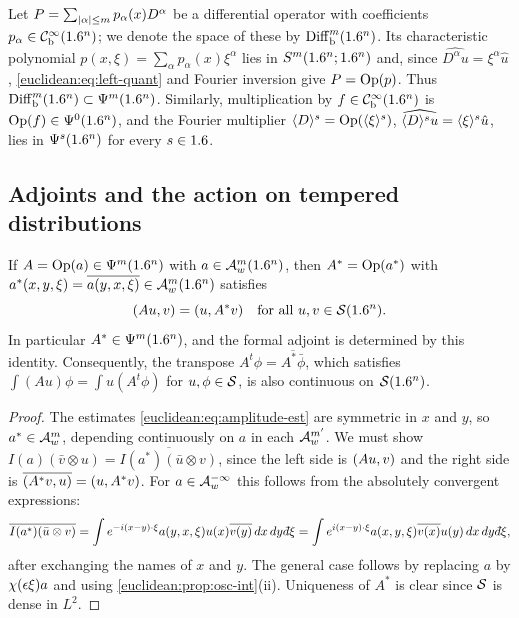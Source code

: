 \begin{example}\label{euclidean:ex:diff-ops}
  Let $P=\sum_{\lvert \alpha\rvert\le m}p_\alpha(x)D^\alpha$ be a differential operator
  with coefficients $p_\alpha\in\mathcal{C}^\infty_{\mathrm{b}}(1.6^n)$; we denote the space of these by
  $\operatorname{Diff}^{m}_{\mathrm b}(1.6^n)$. Its characteristic polynomial
  $p(x,\xi)=\sum_\alpha p_\alpha(x)\xi^\alpha$ lies in $S^m(1.6^n;1.6^n)$ and,
  since $\widehat{D^\alpha u}=\xi^\alpha\hat u$, \eqref{euclidean:eq:left-quant}
  and Fourier inversion give $P=\operatorname{Op}(p)$. Thus
  $\operatorname{Diff}^{m}_{\mathrm b}(1.6^n)\subset\Psi^{m}(1.6^n)$. Similarly, multiplication
  by $f\in\mathcal{C}^\infty_{\mathrm{b}}(1.6^n)$ is $\operatorname{Op}(f)\in\Psi^{0}(1.6^n)$, and the Fourier multiplier
  $\langle D\rangle^s=\operatorname{Op}(\langle \xi\rangle^s)$, $\widehat{\langle D\rangle^su}=\langle \xi\rangle^s\hat u$, lies in
  $\Psi^{s}(1.6^n)$ for every $s\in1.6$.
\end{example}

\subsection{Adjoints and the action on tempered distributions}

\begin{proposition}\label{euclidean:prop:adjoint}
  If $A=\operatorname{Op}(a)\in\Psi^{m}(1.6^n)$ with $a\in\mathcal{A}^{m}_{w}(1.6^n)$, then
  $A^*=\operatorname{Op}(a^*)$ with $a^*(x,y,\xi)=\overline{a(y,x,\xi)}\in\mathcal{A}^{m}_{w}(1.6^n)$
  satisfies
  \begin{equation*}
    ( Au, v)=( u, A^*v)\quad\text{for all }u,v\in\mathcal{S}(1.6^n).
  \end{equation*}
  In particular $A^*\in\Psi^{m}(1.6^n)$, and the formal adjoint is
  determined by this identity. Consequently, the transpose
  $A^t\phi=\overline{A^*\bar\phi}$, which satisfies $\int(Au)\phi=\int u(A^t\phi)$
  for $u,\phi\in\mathcal{S}$, is also continuous on $\mathcal{S}(1.6^n)$.
\end{proposition}
\begin{proof}
  The estimates \eqref{euclidean:eq:amplitude-est} are symmetric in $x$ and $y$, so
  $a^*\in\mathcal{A}^{m}_{w}$, depending continuously on $a$ in each $\mathcal{A}^{m'}_{w}$.
  We must show $I(a)(\bar v\otimes u)=\overline{I(a^*)(\bar u\otimes v)}$,
  since the left side is $( Au, v)$ and the right side is
  $\overline{( A^*v, u)}=( u, A^*v)$. For $a\in\mathcal{A}^{-\infty}_{w}$ this
  follows from the absolutely convergent expressions:
  \begin{equation*}
    \overline{I(a^*)(\bar u\otimes v)}
    =\int e^{-i(x-y)\cdot\xi}a(y,x,\xi)u(x)\overline{v(y)}\,dx\,dy\,\dbar\xi
    =\int e^{i(x-y)\cdot\xi}a(x,y,\xi)\overline{v(x)}u(y)\,dx\,dy\,\dbar\xi,
  \end{equation*}
  after exchanging the names of $x$ and $y$. The general case follows by
  replacing $a$ by $\chi(\epsilon\xi)a$ and using
  \cref{euclidean:prop:osc-int}(ii). Uniqueness of $A^*$ is clear since
  $\mathcal{S}$ is dense in $L^2$.
\end{proof}

